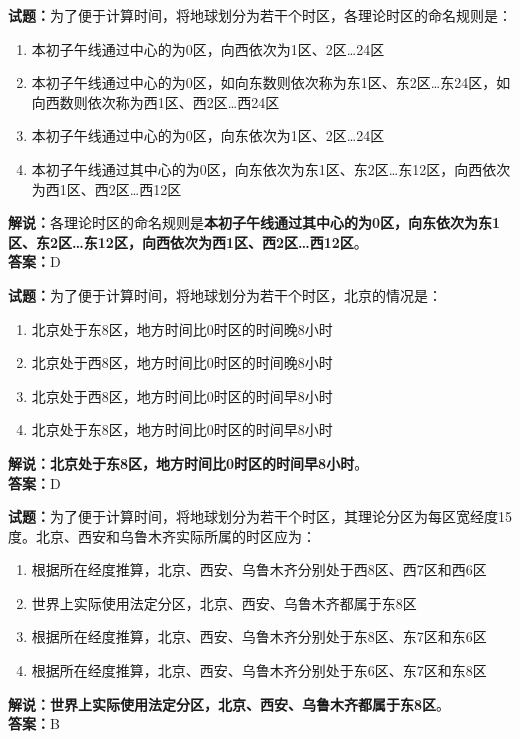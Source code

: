 \documentclass{ctexbook}
\begin{document}
\bigskip


\noindent\textbf{试题：}为了便于计算时间，将地球划分为若干个时区，各理论时区的命名规则是：
\begin{enumerate}[leftmargin=3em]
\item 本初子午线通过中心的为0区，向西依次为1区、2区…24区
\item 本初子午线通过中心的为0区，如向东数则依次称为东1区、东2区…东24区，如向西数则依次称为西1区、西2区…西24区
\item 本初子午线通过中心的为0区，向东依次为1区、2区…24区
\item 本初子午线通过其中心的为0区，向东依次为东1区、东2区…东12区，向西依次为西1区、西2区…西12区
\end{enumerate}
\noindent\textbf{解说：}各理论时区的命名规则是\textbf{本初子午线通过其中心的为0区，向东依次为东1区、东2区…东12区，向西依次为西1区、西2区…西12区}。\\\noindent\textbf{答案：}D




\bigskip


\noindent\textbf{试题：}为了便于计算时间，将地球划分为若干个时区，北京的情况是：
\begin{enumerate}[leftmargin=3em]
\item 北京处于东8区，地方时间比0时区的时间晚8小时
\item 北京处于西8区，地方时间比0时区的时间晚8小时
\item 北京处于西8区，地方时间比0时区的时间早8小时
\item 北京处于东8区，地方时间比0时区的时间早8小时
\end{enumerate}
\noindent\textbf{解说：}\textbf{北京处于东8区，地方时间比0时区的时间早8小时}。\\\noindent\textbf{答案：}D




\bigskip


\noindent\textbf{试题：}为了便于计算时间，将地球划分为若干个时区，其理论分区为每区宽经度15度。北京、西安和乌鲁木齐实际所属的时区应为：
\begin{enumerate}[leftmargin=3em]
\item 根据所在经度推算，北京、西安、乌鲁木齐分别处于西8区、西7区和西6区
\item 世界上实际使用法定分区，北京、西安、乌鲁木齐都属于东8区
\item 根据所在经度推算，北京、西安、乌鲁木齐分别处于东8区、东7区和东6区
\item 根据所在经度推算，北京、西安、乌鲁木齐分别处于东6区、东7区和东8区
\end{enumerate}
\noindent\textbf{解说：}\textbf{世界上实际使用法定分区，北京、西安、乌鲁木齐都属于东8区}。\\\noindent\textbf{答案：}B
\end{document}
